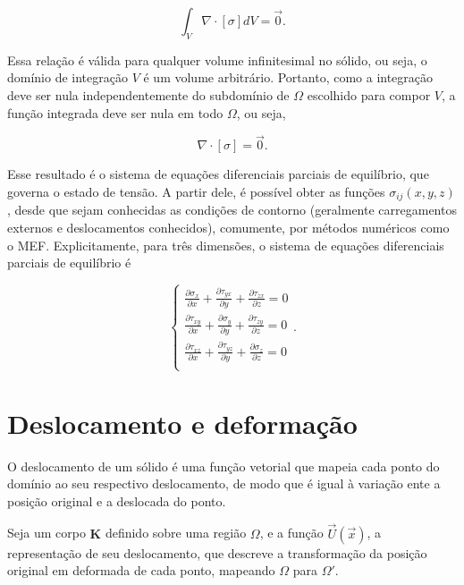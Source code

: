 \begin{equation}
    \int_V \nabla \cdot [\sigma] dV = \vec{0}.
\end{equation}

Essa relação é válida para qualquer volume infinitesimal no sólido, ou seja, o domínio de integração $V$ é um volume arbitrário. Portanto, como a integração deve ser nula independentemente do subdomínio de $\Omega$ escolhido para compor $V$, a função integrada deve ser nula em todo $\Omega$, ou seja,

\begin{equation}
    \nabla \cdot [\sigma] = \vec{0}.
\end{equation}

Esse resultado é o sistema de equações diferenciais parciais de equilíbrio, que governa o estado de tensão. A partir dele, é possível obter as funções $\sigma_{ij}(x,y,z)$, desde que sejam conhecidas as condições de contorno (geralmente carregamentos externos e deslocamentos conhecidos), comumente, por métodos numéricos como o MEF. Explicitamente, para três dimensões, o sistema de equações diferenciais parciais de equilíbrio é

\begin{equation}
    \begin{cases}
       \displaystyle \frac{\partial \sigma_x}{\partial x} + \frac{\partial \tau_{yx}}{\partial y} + \frac{\partial \tau_{zx}}{\partial z} = 0 \\
       \displaystyle \frac{\partial \tau_{xy}}{\partial x} + \frac{\partial \sigma_y}{\partial y} + \frac{\partial \tau_{zy}}{\partial z} = 0 \\
       \displaystyle \frac{\partial \tau_{xz}}{\partial x} + \frac{\partial \tau_{yz}}{\partial y} + \frac{\partial \sigma_z}{\partial z}= 0 \\
    \end{cases}.
\end{equation}


\section{Deslocamento e deformação}

O deslocamento de um sólido é uma função vetorial que mapeia cada ponto do domínio ao seu respectivo deslocamento, de modo que é igual à variação ente a posição original e a deslocada do ponto.

Seja um corpo $\bm{K}$ definido sobre uma região $\Omega$, e a função $\vec{U}(\vec{x})$, a representação de seu deslocamento, que descreve a transformação da posição original em deformada de cada ponto, mapeando $\Omega$ para $\Omega'$.

